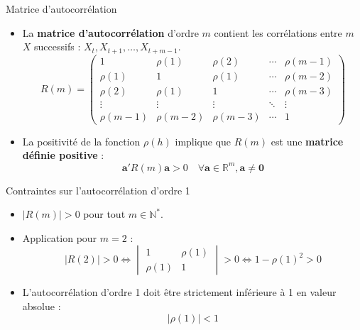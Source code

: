 \documentclass[11pt,aspectratio=169]{beamer}
\newcommand{\R}{\mathbb{R}}
\newcommand{\N}{\mathbb{N}}
\begin{document}
\begin{frame}{Matrice d'autocorrélation}

\begin{itemize}

\item La \textbf{matrice d'autocorrélation} d'ordre $m$ contient les corrélations entre $m$ $X$ successifs : $X_t, X_{t+1}, \ldots, X_{t+m-1}$.
  \[
  R(m) = \begin{pmatrix}
  1 & \rho(1) & \rho(2) & \cdots & \rho(m-1) \\
  \rho(1) & 1 & \rho(1) & \cdots & \rho(m-2) \\
  \rho(2) & \rho(1) & 1 & \cdots & \rho(m-3) \\
  \vdots & \vdots & \vdots & \ddots & \vdots \\
  \rho(m-1) & \rho(m-2) & \rho(m-3) & \cdots & 1
  \end{pmatrix}
  \]\newline

\item La positivité de la fonction $\rho(h)$ implique que $R(m)$ est une \textbf{matrice définie positive} :
  \[
  \mathbf{a}' R(m) \mathbf{a} > 0 \quad \forall \mathbf{a} \in \R^m, \mathbf{a} \neq \mathbf{0}
  \]

\end{itemize}

\end{frame}

\begin{frame}{Contraintes sur l'autocorrélation d'ordre 1}

\begin{itemize}

\item $|R(m)| > 0$ pour tout $m \in \N^*$.\newline

\item Application pour $m = 2$ :
  \[
  |R(2)| > 0 \Leftrightarrow \begin{vmatrix} 1 & \rho(1) \\ \rho(1) & 1 \end{vmatrix} > 0 \Leftrightarrow 1 - \rho(1)^2 > 0
  \]\newline

\item L'autocorrélation d'ordre 1 doit être strictement inférieure à 1 en valeur absolue :
  \[
  |\rho(1)| < 1
  \]

\end{itemize}

\end{frame}
\end{document}
